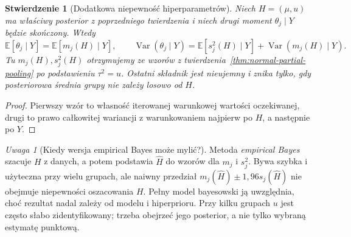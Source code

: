 \documentclass[11pt,a4paper,oneside]{report}
\numberwithin{equation}{chapter}
\theoremstyle{plain}
\newtheorem{stwierdzenie}[twierdzenie]{Stwierdzenie}
\theoremstyle{definition}
\theoremstyle{remark}
\newtheorem{uwaga}{Uwaga}[chapter]
\newcommand{\E}{\mathbb E}
\newcommand{\Var}{\operatorname{Var}}
\begin{document}
\begin{stwierdzenie}[Dodatkowa niepewność hiperparametrów]
\label{prop:hier-variance-hyper}
Niech $H=(\mu,u)$ ma właściwy posterior z poprzedniego
twierdzenia i niech drugi moment $\theta_j\mid Y$ będzie skończony.
Wtedy
\[
 \E[\theta_j\mid Y]=\E[m_j(H)\mid Y],\qquad
 \Var(\theta_j\mid Y)=\E[s_j^2(H)\mid Y]
                       +\Var(m_j(H)\mid Y).
\]
Tu $m_j(H),s_j^2(H)$ otrzymujemy ze wzorów
z twierdzenia~\ref{thm:normal-partial-pooling} po podstawieniu
$\tau^2=u$. Ostatni składnik jest nieujemny i znika tylko,
gdy posteriorowa średnia grupy nie zależy losowo od $H$.
\end{stwierdzenie}
\begin{proof}
Pierwszy wzór to własność iterowanej warunkowej wartości
oczekiwanej, drugi to prawo całkowitej wariancji
z warunkowaniem najpierw po $H$, a następnie po $Y$.
\end{proof}

\begin{uwaga}[Kiedy wersja empirical Bayes może mylić?]
Metoda \emph{empirical Bayes} szacuje $H$ z danych, a potem
podstawia $\widehat H$ do wzorów dla $m_j$ i $s_j^2$.
Bywa szybka i użyteczna przy wielu grupach, ale naiwny
przedział $m_j(\widehat H)\pm1{,}96s_j(\widehat H)$
nie obejmuje niepewności oszacowania $H$. Pełny model
bayesowski ją uwzględnia, choć rezultat nadal zależy od
modelu i hiperprioru. Przy kilku grupach $u$ jest często
słabo zidentyfikowany; trzeba obejrzeć jego posterior,
a nie tylko wybraną estymatę punktową.
\end{uwaga}
\end{document}

